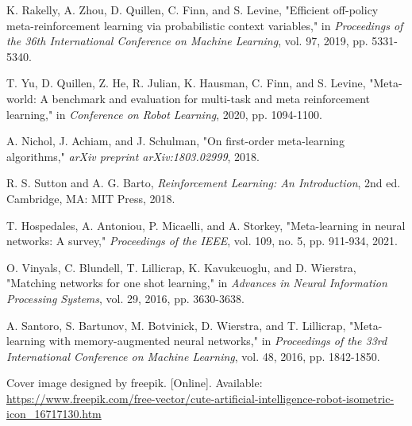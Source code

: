 \documentclass[12pt]{article}
\begin{document}
{{\begin{thebibliography}{9}
				K. Rakelly, A. Zhou, D. Quillen, C. Finn, and S. Levine, "Efficient off-policy meta-reinforcement learning via probabilistic context variables," in \textit{Proceedings of the 36th International Conference on Machine Learning}, vol. 97, 2019, pp. 5331-5340.
				
				T. Yu, D. Quillen, Z. He, R. Julian, K. Hausman, C. Finn, and S. Levine, "Meta-world: A benchmark and evaluation for multi-task and meta reinforcement learning," in \textit{Conference on Robot Learning}, 2020, pp. 1094-1100.
				
				A. Nichol, J. Achiam, and J. Schulman, "On first-order meta-learning algorithms," \textit{arXiv preprint arXiv:1803.02999}, 2018.
				
				R. S. Sutton and A. G. Barto, \textit{Reinforcement Learning: An Introduction}, 2nd ed. Cambridge, MA: MIT Press, 2018.
				
				T. Hospedales, A. Antoniou, P. Micaelli, and A. Storkey, "Meta-learning in neural networks: A survey," \textit{Proceedings of the IEEE}, vol. 109, no. 5, pp. 911-934, 2021.
				
				O. Vinyals, C. Blundell, T. Lillicrap, K. Kavukcuoglu, and D. Wierstra, "Matching networks for one shot learning," in \textit{Advances in Neural Information Processing Systems}, vol. 29, 2016, pp. 3630-3638.
				
				A. Santoro, S. Bartunov, M. Botvinick, D. Wierstra, and T. Lillicrap, "Meta-learning with memory-augmented neural networks," in \textit{Proceedings of the 33rd International Conference on Machine Learning}, vol. 48, 2016, pp. 1842-1850.
				
				Cover image designed by freepik. [Online]. Available: \url{https://www.freepik.com/free-vector/cute-artificial-intelligence-robot-isometric-icon_16717130.htm}
				
			\end{thebibliography}
			
	}}
	
	
\end{document}
